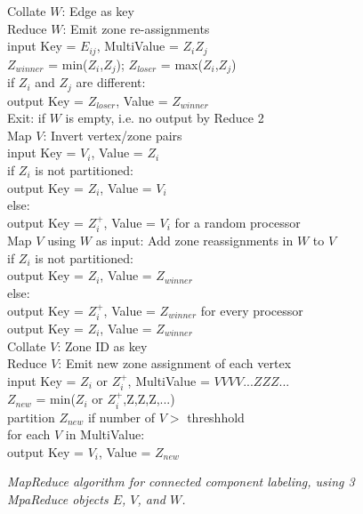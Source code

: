 \begin{figure}[htb]
\begin{center}
{\begin{minipage}{\textwidth}
\begin{tabbing}
 Collate $W$: \> Edge as key \\
 Reduce $W$: \> Emit zone re-assignments \\
       \> \> \> input Key = $E_{ij}$, MultiValue = $Z_i Z_j$ \\
       \> \> \> $Z_{winner}$ = min($Z_i$,$Z_j$); $Z_{loser}$ = max($Z_i$,$Z_j$) \\
       \> \> \> if $Z_i$ and $Z_j$ are different: \\
      \> \> \> \> output Key = $Z_{loser}$, Value = $Z_{winner}$ \\
 Exit: \> if $W$ is empty, i.e. no output by Reduce 2 \\
 Map $V$: \> Invert vertex/zone pairs \\
    \> \> \> input Key = $V_i$, Value = $Z_i$ \\
    \> \> \> if $Z_i$ is not partitioned: \\
   \> \> \> \> output Key = $Z_i$, Value = $V_i$ \\
    \> \> \> else: \\
   \> \> \> \> output Key = $Z_i^+$, Value = $V_i$ for a random processor \\
 Map $V$ using $W$ as input: \> Add zone reassignments in $W$ to $V$ \\
    \> \> \> if $Z_i$ is not partitioned: \\
   \> \> \> \> output Key = $Z_i$, Value = $Z_{winner}$ \\
    \> \> \> else: \\
   \> \> \> \> output Key = $Z_i^+$, Value = $Z_{winner}$ for every processor \\
   \> \> \> \> output Key = $Z_i$, Value = $Z_{winner}$ \\
 Collate $V$: \> Zone ID as key \\
 Reduce $V$: \> Emit new zone assignment of each vertex \\
       \> \> \> input Key = $Z_i$ or $Z_i^+$, MultiValue = $V V V V ... Z Z Z ...$ \\
       \> \> \> $Z_{new}$ = min($Z_i$ or $Z_i^+$,Z,Z,Z,...) \\
       \> \> \> partition $Z_{new}$ if number of $V >$ threshhold \\
       \> \> \> for each $V$ in MultiValue: \\
      \> \> \> \> output Key = $V_i$, Value = $Z_{new}$

  \end{tabbing}
 \end{minipage}}\end{center}

 \caption{\it MapReduce algorithm for connected component labeling,
 using 3 MpaReduce objects $E$, $V$, and $W$.}

 \label{fig:cc}
\end{figure}

